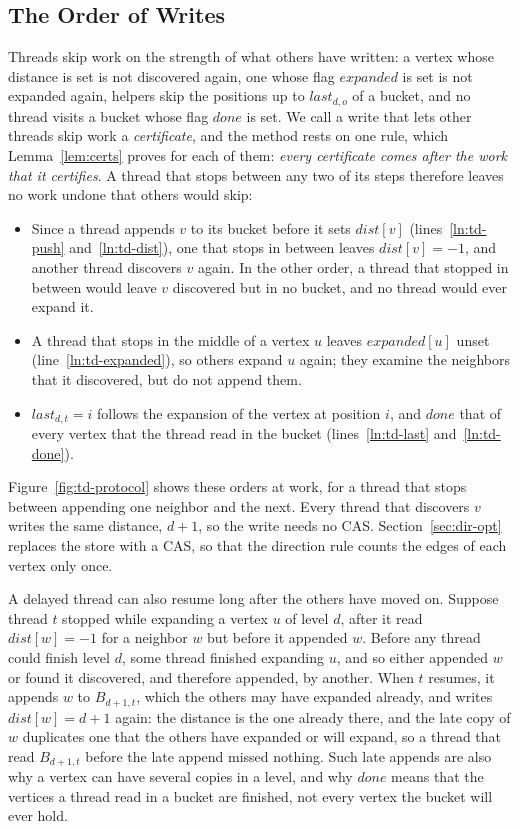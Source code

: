 \subsection{The Order of Writes}
\label{sec:td-order}

Threads skip work on the strength of what others have written: a vertex whose distance is set is not discovered again, one whose flag $\mathit{expanded}$ is set is not expanded again, helpers skip the positions up to $\mathit{last}_{d,o}$ of a bucket, and no thread visits a bucket whose flag $\mathit{done}$ is set. We call a write that lets other threads skip work a \emph{certificate}, and the method rests on one rule, which Lemma~\ref{lem:certs} proves for each of them: \emph{every certificate comes after the work that it certifies}. A thread that stops between any two of its steps therefore leaves no work undone that others would skip:
\begin{itemize}
    \item Since a thread appends $v$ to its bucket before it sets $\mathit{dist}[v]$ (lines~\ref{ln:td-push} and~\ref{ln:td-dist}), one that stops in between leaves $\mathit{dist}[v] = -1$, and another thread discovers $v$ again. In the other order, a thread that stopped in between would leave $v$ discovered but in no bucket, and no thread would ever expand it.
    \item A thread that stops in the middle of a vertex $u$ leaves $\mathit{expanded}[u]$ unset (line~\ref{ln:td-expanded}), so others expand $u$ again; they examine the neighbors that it discovered, but do not append them.
    \item $\mathit{last}_{d,t} = i$ follows the expansion of the vertex at position $i$, and $\mathit{done}$ that of every vertex that the thread read in the bucket (lines~\ref{ln:td-last} and~\ref{ln:td-done}).
\end{itemize}
Figure~\ref{fig:td-protocol} shows these orders at work, for a thread that stops between appending one neighbor and the next.
Every thread that discovers $v$ writes the same distance, $d+1$, so the write needs no CAS. Section~\ref{sec:dir-opt} replaces the store with a CAS, so that the direction rule counts the edges of each vertex only once.

A delayed thread can also resume long after the others have moved on. Suppose thread $t$ stopped while expanding a vertex $u$ of level $d$, after it read $\mathit{dist}[w] = -1$ for a neighbor $w$ but before it appended $w$. Before any thread could finish level $d$, some thread finished expanding $u$, and so either appended $w$ or found it discovered, and therefore appended, by another. When $t$ resumes, it appends $w$ to $B_{d+1,t}$, which the others may have expanded already, and writes $\mathit{dist}[w] = d+1$ again: the distance is the one already there, and the late copy of $w$ duplicates one that the others have expanded or will expand, so a thread that read $B_{d+1,t}$ before the late append missed nothing. Such late appends are also why a vertex can have several copies in a level, and why $\mathit{done}$ means that the vertices a thread read in a bucket are finished, not every vertex the bucket will ever hold.

